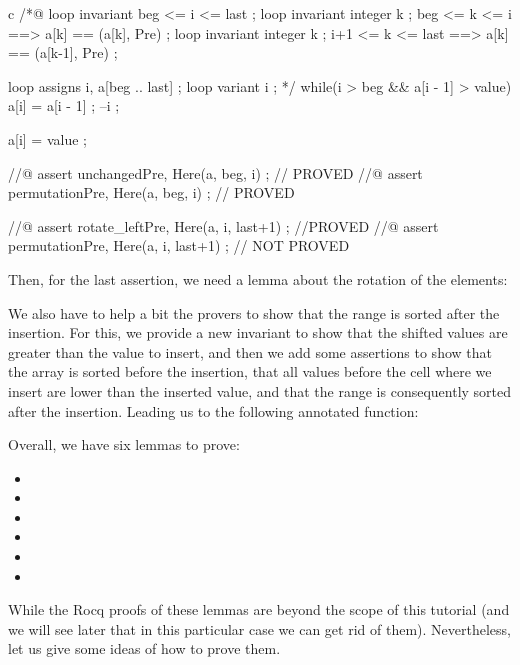 \begin{CodeBlock}{c}
  /*@
    loop invariant beg <= i <= last ;
    loop invariant \forall integer k ; beg <= k <= i    ==> a[k] == \at(a[k], Pre) ;
    loop invariant \forall integer k ; i+1 <= k <= last ==> a[k] == \at(a[k-1], Pre) ;

    loop assigns i, a[beg .. last] ;
    loop variant i ;
  */
  while(i > beg && a[i - 1] > value){
    a[i] = a[i - 1] ;
    --i ;
  }

  a[i] = value ;

  //@ assert unchanged{Pre, Here}(a, beg, i) ;   // PROVED
  //@ assert permutation{Pre, Here}(a, beg, i) ; // PROVED

  //@ assert rotate_left{Pre, Here}(a, i, last+1) ; //PROVED
  //@ assert permutation{Pre, Here}(a, i, last+1) ; // NOT PROVED
\end{CodeBlock}


Then, for the last assertion, we need a lemma about the rotation of the
elements:



We also have to help a bit the provers to show that the range is
sorted after the insertion. For this, we provide a new invariant to show
that the shifted values are greater than the value to insert, and then
we add some assertions to show that the array is sorted before the
insertion, that all values before the cell where we insert are lower than
the inserted value, and that the range is consequently sorted after the
insertion. Leading us to the following annotated 
function:





Overall, we have six lemmas to prove:
\begin{itemize}
\item {}
\item {}
\item {}
\item {}
\item {}
\item {}
\end{itemize}

While the Rocq proofs of these lemmas are beyond the scope of this tutorial (and
we will see later that in this particular case we can get rid of them).
Nevertheless, let us give some ideas of how to prove them.


